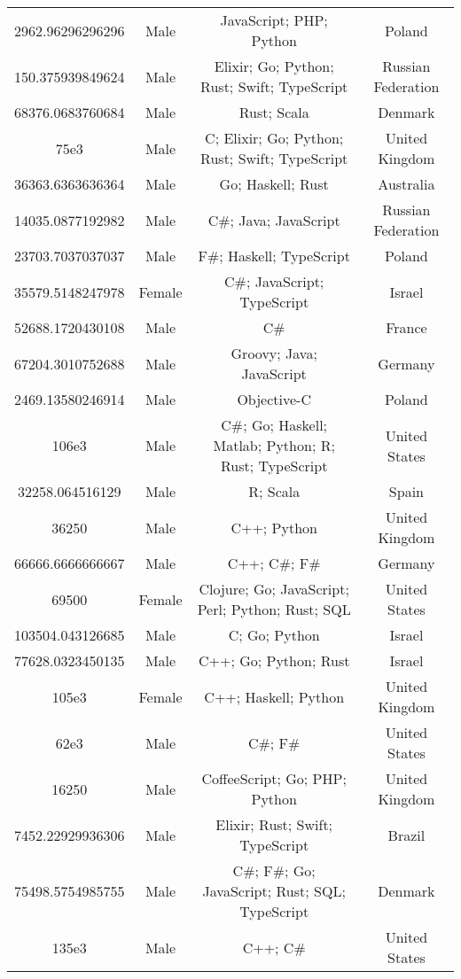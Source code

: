 \begin{center}
\begin{tabular}{ |c|c|c|c| }
2962.96296296296  &  Male  &  JavaScript; PHP; Python  &  Poland  \\ 
150.375939849624  &  Male  &  Elixir; Go; Python; Rust; Swift; TypeScript  &  Russian Federation  \\ 
68376.0683760684  &  Male  &  Rust; Scala  &  Denmark  \\ 
75e3  &  Male  &  C; Elixir; Go; Python; Rust; Swift; TypeScript  &  United Kingdom  \\ 
36363.6363636364  &  Male  &  Go; Haskell; Rust  &  Australia  \\ 
14035.0877192982  &  Male  &  C\#; Java; JavaScript  &  Russian Federation  \\ 
23703.7037037037  &  Male  &  F\#; Haskell; TypeScript  &  Poland  \\ 
35579.5148247978  &  Female  &  C\#; JavaScript; TypeScript  &  Israel  \\ 
52688.1720430108  &  Male  &  C\#  &  France  \\ 
67204.3010752688  &  Male  &  Groovy; Java; JavaScript  &  Germany  \\ 
2469.13580246914  &  Male  &  Objective-C  &  Poland  \\ 
106e3  &  Male  &  C\#; Go; Haskell; Matlab; Python; R; Rust; TypeScript  &  United States  \\ 
32258.064516129  &  Male  &  R; Scala  &  Spain  \\ 
36250  &  Male  &  C++; Python  &  United Kingdom  \\ 
66666.6666666667  &  Male  &  C++; C\#; F\#  &  Germany  \\ 
69500  &  Female  &  Clojure; Go; JavaScript; Perl; Python; Rust; SQL  &  United States  \\ 
103504.043126685  &  Male  &  C; Go; Python  &  Israel  \\ 
77628.0323450135  &  Male  &  C++; Go; Python; Rust  &  Israel  \\ 
105e3  &  Female  &  C++; Haskell; Python  &  United Kingdom  \\ 
62e3  &  Male  &  C\#; F\#  &  United States  \\ 
16250  &  Male  &  CoffeeScript; Go; PHP; Python  &  United Kingdom  \\ 
7452.22929936306  &  Male  &  Elixir; Rust; Swift; TypeScript  &  Brazil  \\ 
75498.5754985755  &  Male  &  C\#; F\#; Go; JavaScript; Rust; SQL; TypeScript  &  Denmark  \\ 
135e3  &  Male  &  C++; C\#  &  United States  \\ 

\end{tabular}
\end{center}
